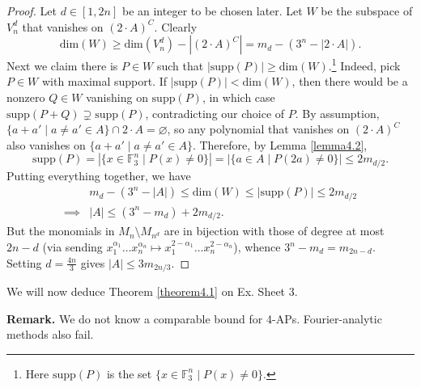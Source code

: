 \documentclass{article}
\theoremstyle{definition}
\begin{document}
\begin{proof}
    Let $d \in [1,2n]$ be an integer to be chosen later. Let $W$ be the subspace of $V_n^d$ that vanishes on $(2\cdot A)^C$. Clearly $$\text{dim}(W)\ge \text{dim}(V_n^d)-\left|(2\cdot A)^C\right| = m_d - (3^n - \left|2\cdot A\right|).$$ Next we claim there is $P \in W$ such that $\left|\text{supp}(P)\right|\ge \text{dim}(W)$.\footnote{Here $\text{supp}(P)$ is the set $\{x \in \mathbb{F}_3^n \mid P(x) \neq 0\}$.} Indeed, pick $P \in W$ with maximal support. If $\left|\text{supp}(P)\right|<\text{dim}(W)$, then there would be a nonzero $Q \in W$ vanishing on $\text{supp}(P)$, in which case $\text{supp}(P+Q) \supsetneq \text{supp}(P)$, contradicting our choice of $P$. By assumption, $\{a+a' \mid a \neq a' \in A\} \cap 2\cdot A = \varnothing$, so any polynomial that vanishes on $(2\cdot A)^C$ also vanishes on $\{a + a' \mid a \neq a' \in A\}$. Therefore, by Lemma \ref{lemma4.2}, $$\text{supp}(P) = \left|\{x \in \mathbb{F}_3^n \mid P(x)\neq 0\}\right| = \left|\{a \in A \mid P(2a) \neq 0\}\right|\le 2m_{d/2}.$$
    Putting everything together, we have
    \begin{align*}
        & m_d - (3^n - \left|A\right|)\le \text{dim}(W) \le \left|\text{supp}(P)\right| \le 2m_{d/2} \\
        \implies & \left|A\right|\le (3^n - m_d)+ 2 m_{d/2}.
    \end{align*}
    But the monomials in $M_n\setminus M_{n^d}$ are in bijection with those of degree at most $2n-d$ (via sending $x_1^{\alpha_1}\ldots x_n^{\alpha_n} \mapsto x_1^{2-\alpha_1}\ldots x_n^{2-\alpha_n}$), whence $3^n - m_d = m_{2n-d}$. Setting $d = \frac{4n}{3}$ gives $\left|A\right|\le 3m_{2n/3}$.    
\end{proof}
We will now deduce Theorem \ref{theorem4.1} on Ex. Sheet 3.
\vspace{1mm}
 
\textbf{Remark.} We do not know a comparable bound for 4-APs. Fourier-analytic methods also fail.
\end{document}
